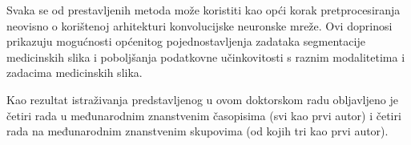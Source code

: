 Svaka se od prestavljenih metoda može koristiti kao opći korak pretprocesiranja neovisno o korištenoj arhitekturi konvolucijske neuronske mreže. Ovi doprinosi prikazuju mogućnosti općenitog pojednostavljenja zadataka segmentacije medicinskih slika i poboljšanja podatkovne učinkovitosti s raznim modalitetima i zadacima medicinskih slika.

Kao rezultat istraživanja predstavljenog u ovom doktorskom radu obljavljeno je četiri rada u međunarodnim znanstvenim časopisima (svi kao prvi autor) i četiri rada na međunarodnim znanstvenim skupovima (od kojih tri kao prvi autor).
